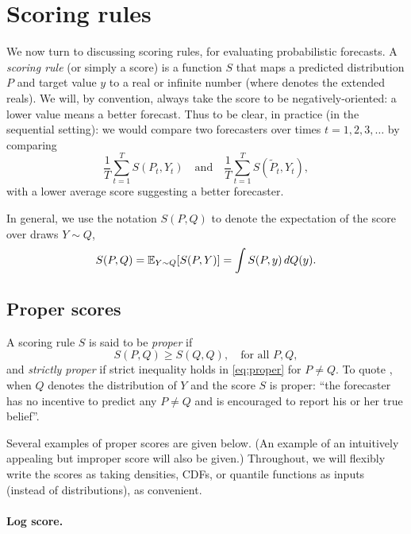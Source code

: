 \documentclass{article}
\begin{document}
\section{Scoring rules}

We now turn to discussing scoring rules, for evaluating probabilistic
forecasts. A \emph{scoring rule} (or simply a score) is a function $S$ that maps
a predicted distribution $P$ and target value $y$ to a real or infinite number 
 (where \smash{$\widebar\R = \R \cup \{\pm 
  \infty\}$} denotes the extended reals). We will, by convention, always take
the score to be negatively-oriented: a lower value means a better forecast.    
Thus to be clear, in practice (in the sequential setting): we would compare two 
forecasters  over times $t=1,2,3,\dots$ by comparing    
\[
\frac{1}{T} \sum_{t=1}^T S(P_t, Y_t) \quad \text{and} \quad
\frac{1}{T} \sum_{t=1}^T S(\tilde{P}_t, Y_t),
\]
with a lower average score suggesting a better forecaster.

In general, we use the notation $S(P, Q)$ to denote the expectation of the score
over draws $Y \sim Q$,  
\[
S(P, Q) = \mathbb{E}_{Y \sim Q} [S(P, Y)] = \int S(P, y) \, dQ(y).
\]

\subsection{Proper scores}

A scoring rule $S$ is said to be \emph{proper} if
\begin{equation}
\label{eq:proper}
S(P, Q) \geq S(Q, Q), \quad \text{for all $P,Q$},
\end{equation}
and \emph{strictly proper} if strict inequality holds in \eqref{eq:proper} for
$P \not= Q$. To quote \citet{gneiting2007strictly}, when $Q$ denotes the 
distribution of $Y$ and the score $S$ is proper: ``the forecaster has no
incentive to predict any $P \not= Q$ and is encouraged to report his or her true
belief''.  

Several examples of proper scores are given below. (An example of an intuitively
appealing but improper score will also be given.) Throughout, we will flexibly
write the scores as taking densities, CDFs, or quantile functions as inputs
(instead of distributions), as convenient.        

\paragraph{Log score.}
\end{document}
